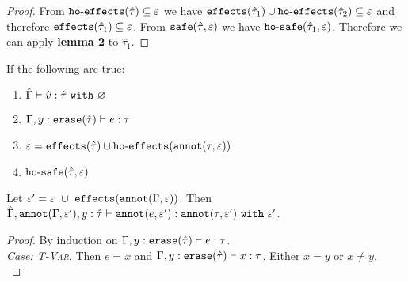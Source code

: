 \begin{appendix}
\begin{proof}
From $\mathtt{ho \hbox{-} effects}(\hat \tau) \subseteq \varepsilon$ we have $\mathtt{effects}(\hat \tau_1) \cup \mathtt{ho \hbox{-} effects}(\hat \tau_2) \subseteq \varepsilon$ and therefore $\mathtt{effects}(\hat \tau_1) \subseteq \varepsilon$. From $\mathtt{safe}(\hat \tau, \varepsilon)$ we have $\mathtt{ho \hbox{-} safe}(\hat \tau_1, \varepsilon)$. Therefore we can apply \textbf{lemma 2} to $\hat \tau_1$.

\end{proof}


\hrulefill

\begin{lemma}[Annotation]
If the following are true:

\begin{enumerate}
	\setlength\itemsep{-0.7em}
	\item $\hat \Gamma \vdash \hat v : \hat \tau~\mathtt{with}~ \varnothing$
	\item $\Gamma, y: \mathtt{erase}(\hat \tau) \vdash e: \tau$
	\item $\varepsilon = \mathtt{effects}(\hat \tau) \cup \mathtt{ho \hbox{-} effects}(\mathtt{annot}(\tau, \varepsilon))$
	\item $\mathtt{ho \hbox{-} safe}(\hat \tau, \varepsilon)$
\end{enumerate}

\noindent
Let $\varepsilon' = \varepsilon~\cup~ \mathtt{effects}(\mathtt{annot}(\Gamma, \varepsilon))$. Then $\hat \Gamma, \mathtt{annot}(\Gamma, \varepsilon'), y: \hat \tau \vdash \mathtt{annot}(e, \varepsilon') : \mathtt{annot}(\tau, \varepsilon')~\mathtt{with}~ \varepsilon'$.
\end{lemma}

\begin{proof}
By induction on $\Gamma, y: \mathtt{erase}(\hat \tau) \vdash e: \tau$.\\

\textit{Case: \textsc{T-Var}}. Then $e=x$ and $\Gamma, y: \mathtt{erase}(\hat \tau) \vdash x: \tau$. Either $x=y$ or $x \neq y$. \\


\end{proof}
\end{appendix}
